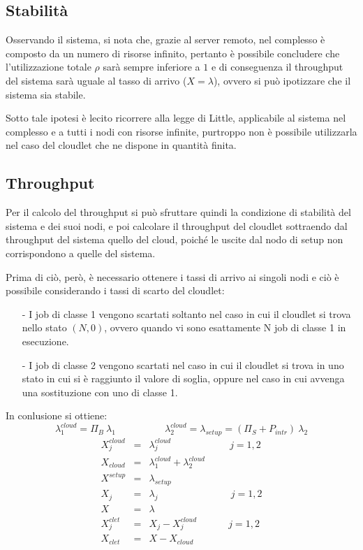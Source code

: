 \subsection{Stabilità}
Osservando il sistema, si nota che, grazie al server remoto, nel complesso è
composto da un numero di risorse infinito, pertanto è possibile concludere che
l'utilizzazione totale $\rho$ sarà sempre inferiore a $1$ e di conseguenza il
throughput del sistema sarà uguale al tasso di arrivo ($X=\lambda$), ovvero si
può ipotizzare che il sistema sia stabile.

Sotto tale ipotesi è lecito ricorrere alla legge di Little, applicabile
al sistema nel complesso e a tutti i nodi con risorse infinite, purtroppo non è
possibile utilizzarla nel caso del cloudlet che ne dispone in quantità finita.
\subsection{Throughput}
Per il calcolo del throughput si può sfruttare quindi la condizione di stabilità
del sistema e dei suoi nodi, e poi calcolare il throughput del cloudlet
sottraendo dal throughput del sistema quello del cloud, poiché le uscite dal
nodo di setup non corrispondono a quelle del sistema.

Prima di ciò, però, è necessario ottenere i tassi di arrivo ai singoli nodi e
ciò è possibile considerando i tassi di scarto del cloudlet:
\begin{itemize}
\item[-]I job di classe 1 vengono scartati soltanto nel caso in cui il cloudlet
si trova nello stato $(N, 0)$, ovvero quando vi sono esattamente N job di classe
1 in esecuzione.
\item[-]I job di classe 2 vengono scartati nel caso in cui il cloudlet si trova
in uno stato in cui si è raggiunto il valore di soglia, oppure nel caso in cui
avvenga una sostituzione con uno di classe 1. 
\end{itemize}

In conlusione si ottiene:
\begin{displaymath}
\lambda_1^{cloud} = \Pi_B \ \lambda_1 
\qquad\quad\qquad
\lambda_2^{cloud} = \lambda_{setup} = (\Pi_S + P_{intr}) \ \lambda_2 
\end{displaymath}
%
\begin{eqnarray}
X_j^{cloud} &=& \lambda_j^{cloud}   \qquad\quad\qquad\quad j=1,2 \\
X_{cloud} &=& \lambda_1^{cloud} + \lambda_2^{cloud}   \\
X^{setup} &=& \lambda_{setup}   \\
X_j &=& \lambda_j  \ \quad\qquad\quad\qquad \ \quad j=1,2 \\
X &=& \lambda \\
X_j^{clet} &=& X_j - X_j^{cloud} \ \qquad\quad j=1,2 \\
X_{clet} &=& X - X_{cloud} 
\end{eqnarray}
